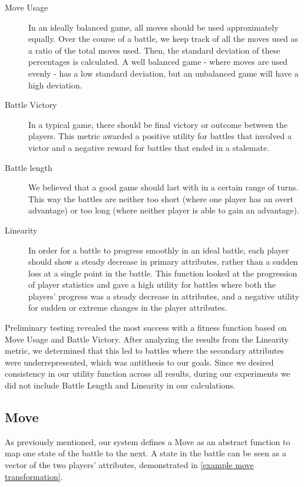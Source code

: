 \documentclass{acm_proc_article-sp}
\begin{document}
\begin{description}
    \item[Move Usage] In an ideally balanced game, all moves should be used approximately equally. Over the course of a battle, we keep track of all the moves used as a ratio of the total moves used. Then, the standard deviation of these percentages is calculated. A well balanced game - where moves are used evenly - has a low standard deviation, but an unbalanced game will have a high deviation.
    \item[Battle Victory] In a typical game, there should be final victory or outcome between the players. This metric awarded a positive utility for battles that involved a victor and a negative reward for battles that ended in a stalemate.
    \item[Battle length] We believed that a good game should last with in a certain range of turns. This way the battles are neither too short (where one player has an overt advantage) or too long (where neither player is able to gain an advantage). 
    \item[Linearity] In order for a battle to progress smoothly in an ideal battle, each player should show a steady decrease in primary attributes, rather than a sudden loss at a single point in the battle. This function looked at the progression of player statistics and gave a high utility for battles where both the players’ progress was a steady decrease in attributes, and a negative utility for sudden or extreme changes in the player attributes.
\end{description}

Preliminary testing revealed the most success with a fitness function based on Move Usage and Battle Victory. After analyzing the results from the Linearity metric, we determined that this led to battles where the secondary attributes were underrepresented, which was antithesis to our goals. Since we desired consistency in our utility function across all results, during our experiments we did not include Battle Length and Linearity in our calculations.

\subsection{Move}

As previously mentioned, our system defines a Move as an abstract function to map one state of the battle to the next. A state in the battle can be seen as a vector of the two players’ attributes, demonstrated in \ref{example move transformation}. 
\end{document}
